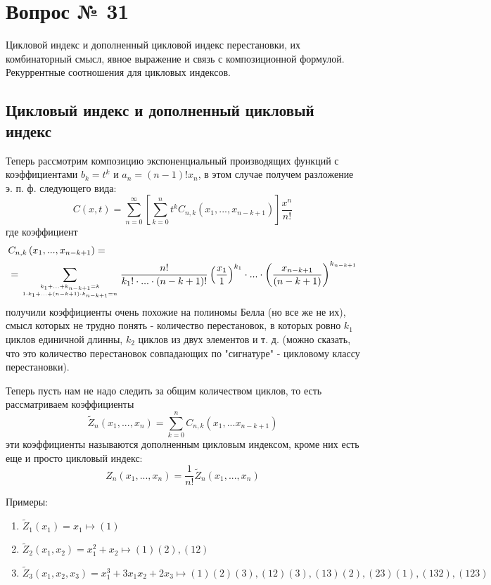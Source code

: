 \chapter{Вопрос № 31}

Цикловой индекс и дополненный цикловой индекс перестановки, их комбинаторный смысл, явное выражение и связь с композиционной формулой. Рекуррентные соотношения для цикловых индексов.

\section{Цикловый индекс и дополненный цикловый индекс}

Теперь рассмотрим композицию экспоненциальный производящих функций с коэффициентами $b_k = t^k$ и $a_n = \left(n-1\right)!x_n$, в этом случае получем разложение э. п. ф. следующего вида:
\[
	C\left(x,t\right) = \sum_{n=0}^{\infty} \left[\sum_{k=0}^n t^k C_{n,k}\left(x_1,...,x_{n-k+1}\right)\right]\frac{x^n}{n!}
\]
где коэффициент
\[
	\begin{split}
		&C_{n,k}\left(x_1, ... , x_{n-k+1}\right) =\\
		& = \sum_{
			k_1 + ... + k_{n-k+1} = k
			\atop
			1\cdot k_1 + ... +\left(n-k+1\right)\cdot k_{n-k+1} = n
			} \frac{n!}{k_1!\cdot ... \cdot \left(n-k+1\right)!} \left(\frac{x_1}{1}\right)^{k_1}\cdot...\cdot\left(\frac{x_{n-k+1}}{\left(n-k+1\right)}\right)^{k_{n-k+1}}
	\end{split}
\]
получили коэффициенты очень похожие на полиномы Белла (но все же не их), смысл которых не трудно понять - количество перестановок, в которых ровно $k_1$ циклов единичной длинны, $k_2$ циклов из двух элементов и т. д. (можно сказать, что это количество перестановок совпадающих по "сигнатуре" - цикловому классу перестановки).

Теперь пусть нам не надо следить за общим количеством циклов, то есть рассматриваем коэффициенты
\[
	\tilde Z_n \left(x_1, ... , x_n\right) = \sum_{k=0}^n C_{n,k}\left(x_1, ... x_{n-k+1}\right)
\]
эти коэффициенты называются дополненным цикловым индексом, кроме них есть еще и просто цикловый индекс:
\[
	Z_n \left(x_1, ..., x_n\right) = \frac{1}{n!} \tilde Z_n \left(x_1, ..., x_n\right)
\]

Примеры:
\begin{enumerate}
\item $\tilde Z_1 \left(x_1\right) = x_1 \mapsto \left(1\right)$

\item $\tilde Z_2 \left(x_1,x_2\right) = x_1^2 + x_2 \mapsto \left(1\right)\left(2\right),\left(12\right)$

\item $\tilde Z_3 \left(x_1, x_2, x_3\right) = x_1^3 + 3x_1x_2 + 2x_3 \mapsto \left(1\right)\left(2\right)\left(3\right),\left(12\right)\left(3\right),\left(13\right)\left(2\right), \left(23\right)\left(1\right), \left(132\right),\left(123\right)$
\end{enumerate}

